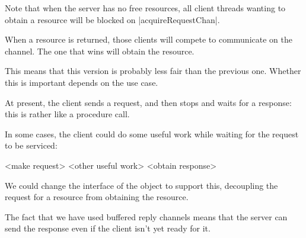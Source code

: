 
\begin{slide}

Note that when the server has no free resources, all client threads wanting to
obtain a resource will be blocked on |acquireRequestChan|.

When a resource is returned, those clients will compete to communicate on the
channel.  The one that wins will obtain the resource.

This means that this version is probably less fair than the previous one.
Whether this is important depends on the use case.
\end{slide}



\begin{slide}

At present, the client sends a request, and then stops and waits for a
response: this is rather like a procedure call.

In some cases, the client could do some useful work while waiting for the
request to be serviced:
%
\begin{scala}
<make request>
<other useful work>
<obtain response>
\end{scala}
%

We could change the interface of the object to support this, decoupling the
request for a resource from obtaining the resource.

The fact that we have used buffered reply channels means that the server can
send the response even if the client isn't yet ready for it.  



\end{slide}






